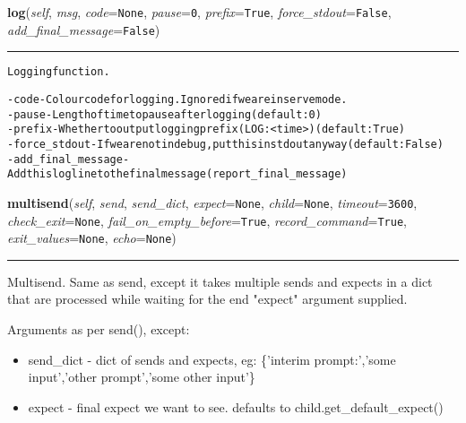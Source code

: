 \hspace{.8\funcindent}\begin{boxedminipage}{\funcwidth}

    \raggedright \textbf{log}(\textit{self}, \textit{msg}, \textit{code}={\tt None}, \textit{pause}={\tt 0}, \textit{prefix}={\tt True}, \textit{force\_stdout}={\tt False}, \textit{add\_final\_message}={\tt False})

    \vspace{-1.5ex}

    \rule{\textwidth}{0.5\fboxrule}
\setlength{\parskip}{2ex}
\begin{alltt}
Logging function.

- code         - Colour code for logging. Ignored if we are in serve mode.
- pause        - Length of time to pause after logging (default: 0)
- prefix       - Whether to output logging prefix (LOG: {\textless}time{\textgreater}) (default: True)
- force\_stdout - If we are not in debug, put this in stdout anyway (default: False)
- add\_final\_message - Add this log line to the final message (report\_final\_message)
\end{alltt}

\setlength{\parskip}{1ex}
    \end{boxedminipage}

    \label{shutit_global:ShutIt:multisend}

    \vspace{0.5ex}

\hspace{.8\funcindent}\begin{boxedminipage}{\funcwidth}

    \raggedright \textbf{multisend}(\textit{self}, \textit{send}, \textit{send\_dict}, \textit{expect}={\tt None}, \textit{child}={\tt None}, \textit{timeout}={\tt 3600}, \textit{check\_exit}={\tt None}, \textit{fail\_on\_empty\_before}={\tt True}, \textit{record\_command}={\tt True}, \textit{exit\_values}={\tt None}, \textit{echo}={\tt None})

    \vspace{-1.5ex}

    \rule{\textwidth}{0.5\fboxrule}
\setlength{\parskip}{2ex}
    Multisend. Same as send, except it takes multiple sends and expects in 
    a dict that are processed while waiting for the end "expect" argument 
    supplied.

    Arguments as per send(), except:

    \begin{itemize}
    \setlength{\parskip}{0.6ex}
      \item send\_dict - dict of sends and expects, eg: \{'interim 
        prompt:','some input','other prompt','some other input'\}

      \item expect - final expect we want to see. defaults to 
        child.get\_default\_expect()

    \end{itemize}

\setlength{\parskip}{1ex}
    \end{boxedminipage}

